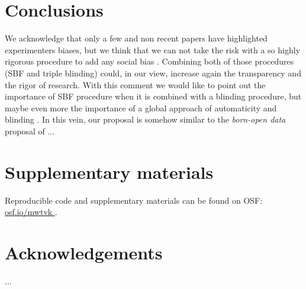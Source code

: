 \documentclass[a4paper,man,natbib,floatsintext,donotrepeattitle]{apa6}
\begin{document}
\section{Conclusions}

We acknowledge that only a few and non recent papers have highlighted experimenters biases, but we think that we can not take the risk with a so highly rigorous procedure to add any social bias . Combining both of those procedures (SBF and triple blinding) could, in our view, increase again the transparency and the rigor of research. With this comment we would like to point out the importance of SBF procedure when it is combined with a blinding procedure, but maybe even more the importance of a global approach of automaticity and blinding . In this vein, our proposal is somehow similar to the \textit{born-open data} proposal of \cite{rouder_what_2016}... 

\section{Supplementary materials}\label{sec:supp}

Reproducible code and supplementary materials can be found on OSF: \url{osf.io/mwtvk
}.

\section{Acknowledgements}

...


\end{document}
